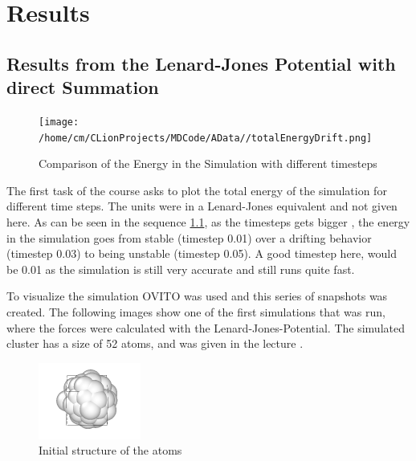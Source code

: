 \chapter{Results}

\section{Results from the Lenard-Jones Potential with direct Summation}

\begin{figure}
	\begin{center}
		\texttt{[image: /home/cm/CLionProjects/MDCode/AData//totalEnergyDrift.png]}
	\end{center}
	\caption[Comparison of the Energy in the Simulation with different timesteps]{Comparison of the Energy in the Simulation with different timesteps}
	\label{SimWithTimestep}
\end{figure}
The first task of the course asks to plot the total energy of the simulation for different time steps. The units were in a Lenard-Jones equivalent and not given here. As can be seen in the sequence \ref{SimWithTimestep}, as the timesteps gets bigger , the energy in the simulation goes from stable (timestep 0.01) over a drifting behavior (timestep 0.03) to being unstable (timestep 0.05). A good timestep here, would be 0.01 as the simulation is still very accurate and still runs quite fast. 
\par
To visualize the simulation OVITO \cite{ovito} was used and this series of snapshots was created. The following images show one of the first simulations that was run, where the forces were calculated with the Lenard-Jones-Potential. The simulated cluster has a size of 52 atoms, and was given in the lecture \cite{molDymCourse}.
\begin{figure}
	\begin{center}
		\includegraphics[scale= 0.65]{Figure/1ImageS.png}
	\end{center}
	\caption[Simulation Snapshot 1]{Initial structure of the atoms}
	\label{SimulationSnapshot1}
\end{figure}

